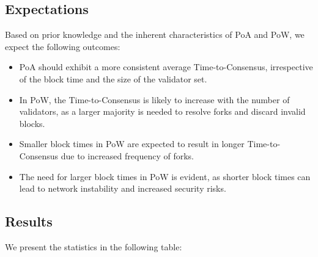 \subsection{Expectations}

Based on prior knowledge and the inherent characteristics of PoA and PoW, we expect the following outcomes:

\begin{itemize}
    \item PoA should exhibit a more consistent average Time-to-Consensus, irrespective of the block time and the size of the validator set.
    \item In PoW, the Time-to-Consensus is likely to increase with the number of validators, as a larger majority is needed to resolve forks and discard invalid blocks.
    \item Smaller block times in PoW are expected to result in longer Time-to-Consensus due to increased frequency of forks.
    \item The need for larger block times in PoW is evident, as shorter block times can lead to network instability and increased security risks.
\end{itemize}

\subsection*{Results}

We present the statistics in the following table:


